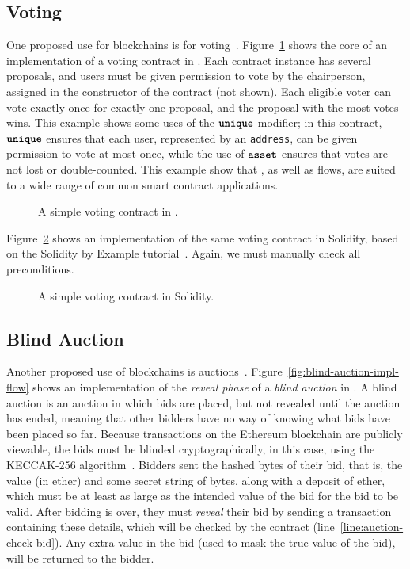 \documentclass[nonacm, dvipsnames, sigconf]{acmart}
\begin{document}
\subsection{Voting}\label{sec:voting-impl}
One proposed use for blockchains is for voting~\cite{Elsden18:Making}.
Figure~\ref{fig:voting-impl-flow} shows the core of an implementation of a voting contract in \langName.
Each contract instance has several proposals, and users must be given permission to vote by the chairperson, assigned in the constructor of the contract (not shown).
Each eligible voter can vote exactly once for exactly one proposal, and the proposal with the most votes wins.
This example shows some uses of the $\textbf{\texttt{unique}}$ modifier; in this contract, $\textbf{\texttt{unique}}$ ensures that each user, represented by an \lstinline{address}, can be given permission to vote at most once, while the use of $\textbf{\texttt{asset}}$ ensures that votes are not lost or double-counted.
This example show that \langName, as well as flows, are suited to a wide range of common smart contract applications.
\begin{figure}
    \centering
    
    \caption{A simple voting contract in \langName.}
    \label{fig:voting-impl-flow}
\end{figure}

Figure~\ref{fig:voting-impl-sol} shows an implementation of the same voting contract in Solidity, based on the Solidity by Example tutorial~\cite{solidityByExample}.
Again, we must manually check all preconditions.
\begin{figure}
    \centering
    
    \caption{A simple voting contract in Solidity.}
    \label{fig:voting-impl-sol}
\end{figure}

\subsection{Blind Auction}\label{sec:blind-auction-impl}
Another proposed use of blockchains is auctions~\cite{Elsden18:Making}.
Figure~\ref{fig:blind-auction-impl-flow} shows an implementation of the \emph{reveal phase} of a \emph{blind auction} in \langName.
A blind auction is an auction in which bids are placed, but not revealed until the auction has ended, meaning that other bidders have no way of knowing what bids have been placed so far.
Because transactions on the Ethereum blockchain are publicly viewable, the bids must be blinded cryptographically, in this case, using the KECCAK-256 algorithm~\cite{bertoni2013keccak}.
Bidders sent the hashed bytes of their bid, that is, the value (in ether) and some secret string of bytes, along with a deposit of ether, which must be at least as large as the intended value of the bid for the bid to be valid.
After bidding is over, they must \emph{reveal} their bid by sending a transaction containing these details, which will be checked by the  contract (line~\ref{line:auction-check-bid}).
Any extra value in the bid (used to mask the true value of the bid), will be returned to the bidder.
\end{document}
